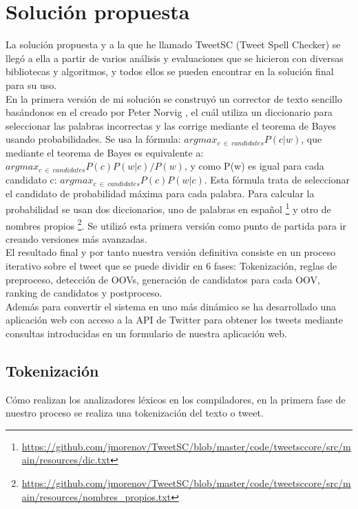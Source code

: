 \documentclass[spanish,12pt, a4paper,twoside]{paper}
\let\oldsection\section
\def\section{\cleardoublepage\oldsection}
\begin{document}
\section{Solución propuesta}\label{sec:solucionpropuesta}
La solución propuesta y a la que he llamado TweetSC (Tweet Spell Checker) \cite{tweetscweb} se llegó a ella a partir de varios análisis y evaluaciones que se hicieron con diversas bibliotecas y algoritmos, y todos ellos se pueden encontrar en la solución final para su uso.\\

En la primera versión de mi solución se construyó un corrector de texto sencillo basándonos en el creado por Peter Norvig \cite{peternorvig}, el cuál utiliza un diccionario para seleccionar las palabras incorrectas y las corrige mediante el teorema de Bayes usando probabilidades. Se usa la fórmula: $argmax_{c\ \in\  candidates}P(c|w)$, que mediante el teorema de Bayes es equivalente a: $argmax_{c\ \in\  candidates}P(c) P(w|c) / P(w)$, y como P(w) es igual para cada candidato c: $argmax_{c\ \in\  candidates}P(c) P(w|c)$. Esta fórmula trata de seleccionar el candidato de probabilidad máxima para cada palabra. Para calcular la probabilidad se usan dos diccionarios, uno de palabras en español \footnote{\url{https://github.com/jmorenov/TweetSC/blob/master/code/tweetsccore/src/main/resources/dic.txt}} y otro de nombres propios \footnote{\url{https://github.com/jmorenov/TweetSC/blob/master/code/tweetsccore/src/main/resources/nombres_propios.txt}}. Se utilizó esta primera versión como punto de partida para ir creando versiones más avanzadas.\\

El resultado final y por tanto nuestra versión definitiva consiste en un proceso iterativo sobre el tweet que se puede dividir en 6 fases: Tokenización, reglas de preproceso, detección de OOVs, generación de candidatos para cada OOV, ranking de candidatos y postproceso.\\

Además para convertir el sistema en uno más dinámico se ha desarrollado una aplicación web con acceso a la API de Twitter para obtener los tweets mediante consultas introducidas en un formulario de nuestra aplicación web.

\subsection{Tokenización}\label{sec:tokenizacion}
Cómo realizan los analizadores léxicos en los compiladores, en la primera fase de nuestro proceso se realiza una tokenización del texto o tweet.\\
\end{document}

